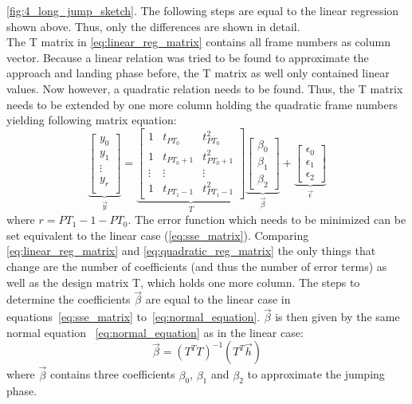 \autoref{fig:4_long_jump_sketch}.
The following steps are equal to the linear regression shown above.
Thus, only the differences are shown in detail.\\
The T matrix in \autoref{eq:linear_reg_matrix} contains all frame
numbers as column vector.
Because a linear relation was tried to be found to approximate the approach
and  landing phase before, the T matrix as well only contained linear values.
Now however, a quadratic relation needs to be found.
Thus, the T matrix needs to be extended by one more column holding the
quadratic frame numbers yielding following matrix equation:
\begin{equation}\label{eq:quadratic_reg_matrix}
    \underbrace{
    \begin{bmatrix}
        y_0\\
        y_1\\
        \vdots\\
        y_r\\
    \end{bmatrix}}_{\vec{y}}
    =
    \underbrace{
    \begin{bmatrix}
        1 & t_{PT_0} & t_{PT_0}^2\\
        1 & t_{PT_0 + 1} & t_{PT_0 + 1}^2\\
        \vdots & \vdots & \vdots\\
        1 & t_{PT_1 - 1} & t_{PT_1 - 1}^2
    \end{bmatrix}}_{T}
    \underbrace{
    \begin{bmatrix}
        \beta_0\\
        \beta_1\\
        \beta_2
    \end{bmatrix}}_{\vec{\beta}}
    +
    \underbrace{
    \begin{bmatrix}
        \epsilon_0\\
        \epsilon_1\\
        \epsilon_2
    \end{bmatrix}}_{\vec{\epsilon}}
\end{equation}
where $r = PT_1 - 1 - PT_0$.
The error function which needs to be minimized can be set equivalent to the
linear case (\autoref{eq:sse_matrix}).
Comparing \autoref{eq:linear_reg_matrix} and \autoref{eq:quadratic_reg_matrix}
the only things that change are the number of coefficients (and thus the
number of error terms) as well as the design matrix T, which holds one more
column.
The steps to determine the coefficients $\vec{\beta}$ are equal to the linear
case in equations~\ref{eq:sse_matrix} to~\ref{eq:normal_equation}.
$\vec{\beta}$ is then given by the same normal equation~
\ref{eq:normal_equation} as in the linear case:
\[
    \vec{\beta} = (T^T T)^{-1}(T^T\vec{h}) 
\] 
where $\vec{\beta}$ contains three coefficients $\beta_0$, $\beta_1$ and
$\beta_2$ to approximate the jumping phase.\\\\

